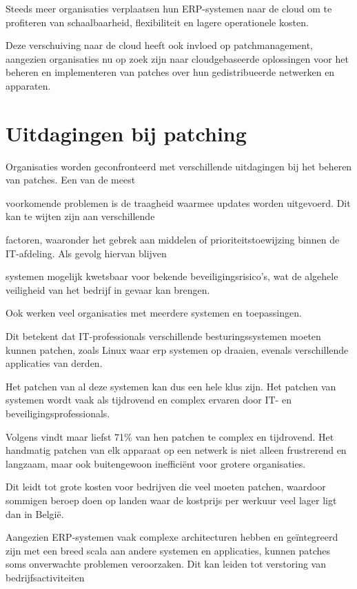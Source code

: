 Steeds meer organisaties verplaatsen hun ERP-systemen naar de cloud om te profiteren van schaalbaarheid, flexibiliteit en lagere operationele kosten.

Deze verschuiving naar de cloud heeft ook invloed op patchmanagement, aangezien organisaties nu op zoek zijn naar cloudgebaseerde oplossingen voor het beheren en implementeren van patches over hun gedistribueerde netwerken en apparaten. \autocite{Kannan2023}

\section{Uitdagingen bij patching}
Organisaties worden geconfronteerd met verschillende uitdagingen bij het beheren van patches. Een van de meest

voorkomende problemen is de traagheid waarmee updates worden uitgevoerd. Dit kan te wijten zijn aan verschillende

factoren, waaronder het gebrek aan middelen of prioriteitstoewijzing binnen de IT-afdeling. Als gevolg hiervan blijven

systemen mogelijk kwetsbaar voor bekende beveiligingsrisico's, wat de algehele veiligheid van het bedrijf in gevaar kan brengen. \autocite{AppMaster2023}

Ook werken veel organisaties met meerdere systemen en toepassingen.

Dit betekent dat IT-professionals verschillende besturingssystemen moeten kunnen patchen, zoals Linux waar erp systemen op draaien, evenals verschillende applicaties van derden.

Het patchen van al deze systemen kan dus een hele klus zijn. Het patchen van systemen wordt vaak als tijdrovend en complex ervaren door IT- en beveiligingsprofessionals.

Volgens \textcite{ivanti2021} vindt maar liefst 71\% van hen patchen te complex en tijdrovend. Het handmatig patchen van elk apparaat op een netwerk is niet alleen frustrerend en langzaam, maar ook buitengewoon inefficiënt voor grotere organisaties.

Dit leidt tot grote kosten voor bedrijven die veel moeten patchen, waardoor sommigen beroep doen op landen waar de kostprijs per werkuur veel lager ligt dan in België. \autocite{Munck2024}

Aangezien ERP-systemen vaak complexe architecturen hebben en geïntegreerd zijn met een breed scala aan andere systemen en applicaties, kunnen patches soms onverwachte problemen veroorzaken. Dit kan leiden tot verstoring van bedrijfsactiviteiten 

